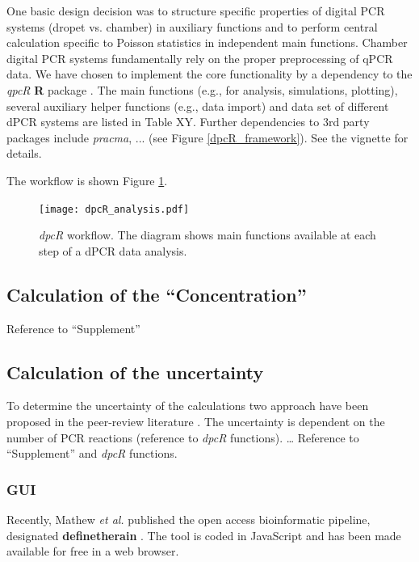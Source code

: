 \documentclass[a4,center,fleqn]{NAR}
\begin{document}
One basic design decision was to structure specific properties of digital PCR 
systems (dropet vs. chamber) in auxiliary functions and to perform central 
calculation specific to Poisson statistics in independent main functions. 
Chamber digital PCR systems fundamentally rely on the proper preprocessing of 
qPCR data. We have chosen to implement the core functionality by a dependency to 
the \textit{qpcR} \textbf{R} package \cite{ritz_qpcr_2008}. The main functions 
(e.g., for analysis, simulations, plotting), several auxiliary helper functions 
(e.g., data import) and data set of different dPCR systems are listed in Table 
XY. Further dependencies to 3rd party packages include \textit{pracma}, ... (see 
Figure \ref{dpcR_framework}). See the vignette for details.

The workflow is shown Figure \ref{workflow}.

\begin{figure}[t]
\begin{center}
\texttt{[image: dpcR\_analysis.pdf]}
\end{center}
\caption{\textit{dpcR} workflow. The diagram shows main functions 
available at each step of a dPCR data analysis.}
\label{workflow}
\end{figure}

\subsection{Calculation of the ``Concentration''}
Reference to ``Supplement''

\subsection{Calculation of the uncertainty}
To determine the uncertainty of the calculations two approach have been proposed 
in the peer-review literature \cite{dube_mathematical_2008, bhat_single_2009}. 
The uncertainty is dependent on the number of PCR reactions (reference to 
\textit{\textit{dpcR}} functions). … Reference to ``Supplement'' and 
\textit{dpcR} functions.

\subsubsection{GUI}

Recently, Mathew \textit{et al.} published the open access bioinformatic 
pipeline, designated \textbf{definetherain} \cite{jones_low_2014}. The tool is 
coded in JavaScript and has been made available for free in a web browser.
\end{document}
